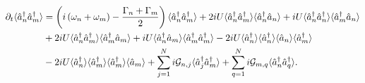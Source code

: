 \begin{adjustwidth}{-3cm}{0cm}
\begin{align}
\partial_t\langle\hat{a}_n^\dagger\hat{a}_m^\dagger\rangle &= \left(i \left(\omega_n + \omega_m\right) - \frac{\Gamma_n + \Gamma_m}{2}\right) \langle \hat{a}_n^\dagger \hat{a}_m^\dagger\rangle + 2 i U \langle\hat{a}_n^\dagger \hat{a}_m^\dagger\rangle \langle \hat{a}_n^\dagger \hat{a}_n\rangle + i U \langle \hat{a}_n^\dagger \hat{a}_n^\dagger \rangle \langle \hat{a}_m^\dagger \hat{a}_n\rangle \notag \\
&+ 2 i U \langle\hat{a}_n^\dagger \hat{a}_m^\dagger \rangle \langle \hat{a}_m^\dagger \hat{a}_m\rangle + i U \langle \hat{a}_n^\dagger \hat{a}_m\rangle \langle \hat{a}_m^\dagger \hat{a}_m^\dagger \rangle - 2 i U \langle\hat{a}_n^\dagger \rangle \langle \hat{a}_n^\dagger \rangle \langle \hat{a}_n \rangle \langle \hat{a}_m^\dagger\rangle \notag \\
&- 2 i U \langle \hat{a}_n^\dagger \rangle \langle \hat{a}_m^\dagger \rangle \langle \hat{a}_m^\dagger \rangle \langle \hat{a}_m\rangle %
 + \sum_{j=1}^N i \mathcal{G}_{n, j} \langle\hat{a}_j^\dagger \hat{a}_m^\dagger\rangle + \sum_{q=1}^N i \mathcal{G}_{m, q} \langle\hat{a}_n^\dagger \hat{a}_q^\dagger\rangle.
\end{align} 
\end{adjustwidth}
\endgroup

%

